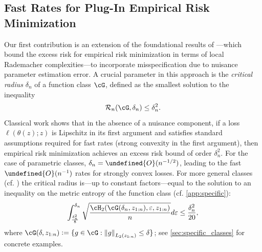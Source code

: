 \documentclass[11pt]{article} %
\newcommand{\pref}[1]{\cref{#1}}
\theoremstyle{theorem}  %
\theoremstyle{plain}
\DeclarePairedDelimiter{\crl}{\{}{\}}
\DeclarePairedDelimiter{\nrm}{\|}{\|}
\newcommand{\veps}{\varepsilon}
\newcommand{\ldef}{\vcentcolon=}
\newcommand{\wt}[1]{\widetilde{#1}}
\let\wt\undefined
\newcommand{\wt}[1]{\widetilde{#1}}
\newcommand{\zr}[1][n]{z_{1:#1}}
\newcommand{\Ot}{\wt{O}}
\newcommand{\Radexp}{\mathcal{R}_n}
\begin{document}
%

\subsection{Fast Rates for Plug-In Empirical Risk Minimization}
Our first contribution is an extension of the foundational results of \cite{bartlett2005local,koltchinskii2000rademacher}---which bound the excess risk for empirical risk minimization in terms of local Rademacher complexities---to incorporate misspecification due to nuisance parameter estimation error. A crucial parameter in this approach is the \emph{critical radius} $\delta_n$ of a function class $\cG$, defined as the smallest solution to the inequality
\begin{equation}
\label{eq:fixed_point0}
\Radexp(\cG,\delta_n) \leq \delta_n^2.
\end{equation}
Classical work shows that in the absence of a nuisance component, if a loss $\ell(\theta(z);z)$ is Lipschitz in its first argument and satisfies standard assumptions required for fast rates (strong convexity in the first argument), then empirical risk minimization achieves an excess risk bound of order $\delta_n^2$. For the case of parametric classes, $\delta_n=\Ot(n^{-1/2})$, leading to the fast $\Ot(n^{-1})$ rates for strongly convex losses. For more general classes (cf. \cite{wainwright2019}) the critical radius is---up to constant factors---equal to the solution to an inequality on the metric entropy of the function class (cf. \pref{app:specific}):
\begin{equation}
\int_{\frac{\delta_n^{2}}{8}}^{\delta_n} \sqrt{\frac{\cH_2(\cG(\delta_n,\zr[n]),\veps,\zr[n])}{n}} d\veps \leq{} \frac{\delta_n^{2}}{20},
\end{equation}
where $\cG(\delta,\zr[n]) \ldef \crl{g\in\cG: \nrm*{g}_{L_2(\zr[n])}\leq{}\delta}$; see \pref{sec:specific_classes} for concrete examples.

%
%
\end{document}
